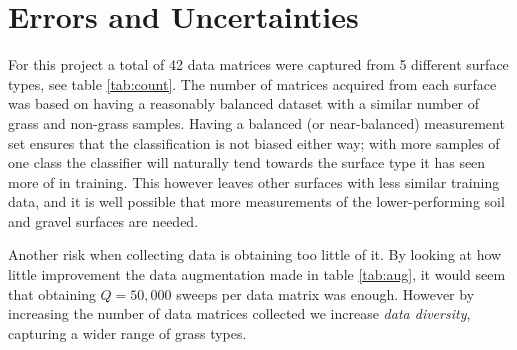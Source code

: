 
\section{Errors and Uncertainties}
For this project a total of 42 data matrices were captured from 5 different surface types, see table \ref{tab:count}. The number of matrices acquired from each surface was based on having a reasonably balanced dataset with a similar number of grass and non-grass samples. Having a balanced (or near-balanced) measurement set ensures that the classification is not biased either way; with more samples of one class the classifier will naturally tend towards the surface type it has seen more of in training. This however leaves other surfaces with less similar training data, and it is well possible that more measurements of the lower-performing soil and gravel surfaces are needed.  


Another risk when collecting data is obtaining too little of it. By looking at how little improvement the data augmentation made in table \ref{tab:aug}, it would seem that obtaining $Q=50,000$ sweeps per data matrix was enough. However by increasing the number of data matrices collected we increase \emph{data diversity}, capturing a wider range of grass types. 

